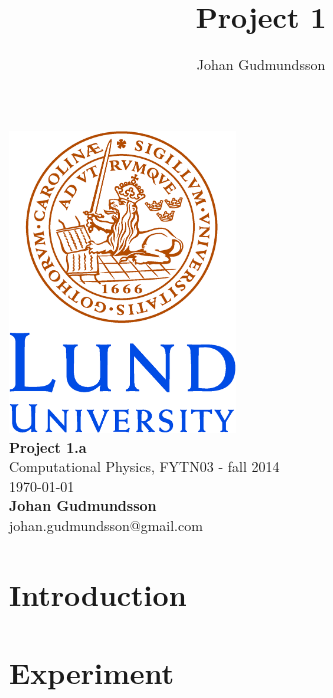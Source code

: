 \documentclass[12pt,a4paper]{report}
\title{Project 1}
\author{Johan Gudmundsson}
\begin{document}
\begin{titlepage}

\begin{center}
\includegraphics[height=8cm]{logocLUeng.eps}
\\[20 mm]
{\large\bf Project 1.a\\[5 mm] }
{Computational Physics, FYTN03 - fall 2014\\[20 mm]}
{\today}\\[20 mm]

{\bf Johan Gudmundsson}
\\
{johan.gudmundsson@gmail.com}

\vfill

\end{center}
\end{titlepage}


\tableofcontents
\newpage 

\chapter{Introduction}
\addtocounter{chapter}{1}


\chapter{Experiment}



\pagebreak
\end{document}

